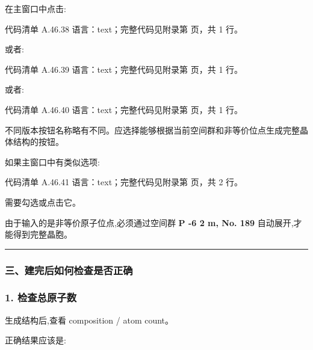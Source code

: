 \documentclass[lang=cn,scheme=chinese,color=blue,device=normal,toc=onecol,math=cm]{elegantbook}
\begin{document}
在主窗口中点击:\par


\begin{codeindexbox}{代码清单 A.46.38}
语言：text；完整代码见附录第 \pageref{code:46:38} 页，共 1 行。
\end{codeindexbox}


或者:\par


\begin{codeindexbox}{代码清单 A.46.39}
语言：text；完整代码见附录第 \pageref{code:46:39} 页，共 1 行。
\end{codeindexbox}


或者:\par


\begin{codeindexbox}{代码清单 A.46.40}
语言：text；完整代码见附录第 \pageref{code:46:40} 页，共 1 行。
\end{codeindexbox}


不同版本按钮名称略有不同。应选择能够根据当前空间群和非等价位点生成完整晶体结构的按钮。\par


如果主窗口中有类似选项:\par


\begin{codeindexbox}{代码清单 A.46.41}
语言：text；完整代码见附录第 \pageref{code:46:41} 页，共 2 行。
\end{codeindexbox}


需要勾选或点击它。\par


由于输入的是非等价原子位点,必须通过空间群 \textbf{P -6 2 m, No. 189} 自动展开,才能得到完整晶胞。\par


\medskip\hrule\medskip


\subsubsection{三、建完后如何检查是否正确}


\subsubsection{1. 检查总原子数}


生成结构后,查看 composition /\allowbreak{} atom count。\par


正确结果应该是:\par
\end{document}
